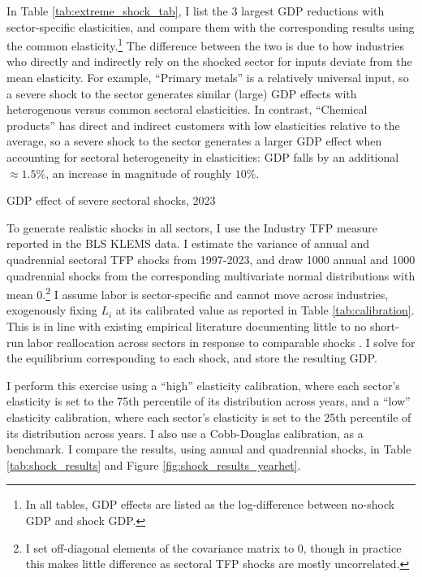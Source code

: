 \documentclass[11pt]{article}
\begin{document}
In Table \ref{tab:extreme_shock_tab}, I list the 3 largest GDP reductions with sector-specific elasticities, and compare them with the corresponding results using the common elasticity.\footnote{In all tables, GDP effects are listed as the log-difference between no-shock GDP and shock GDP.} The difference between the two is due to how industries who directly and indirectly rely on the shocked sector for inputs deviate from the mean elasticity. For example, ``Primary metals'' is a relatively universal input, so a severe shock to the sector generates similar (large) GDP effects with heterogenous versus common sectoral elasticities. In contrast, ``Chemical products'' has direct and indirect customers with low elasticities relative to the average, so a severe shock to the sector generates a larger GDP effect when accounting for sectoral heterogeneity in elasticities: GDP falls by an additional $\approx 1.5$\%, an increase in magnitude of roughly $10\%$.

\begin{table}
    \centering
    \caption{GDP effect of severe sectoral shocks, 2023}
    
    \label{tab:extreme_shock_tab}
\end{table}

To generate realistic shocks in all sectors, I use the Industry TFP measure reported in the BLS KLEMS data. I estimate the variance of annual and quadrennial sectoral TFP shocks from 1997-2023, and draw 1000 annual and 1000 quadrennial shocks from the corresponding multivariate normal distributions with mean 0.\footnote{I set off-diagonal elements of the covariance matrix to 0, though in practice this makes little difference as sectoral TFP shocks are mostly uncorrelated.} I assume labor is sector-specific and cannot move across industries, exogenously fixing $L_i$ at its calibrated value as reported in Table \ref{tab:calibration}. This is in line with existing empirical literature documenting little to no short-run labor reallocation across sectors in response to comparable shocks \citep{acemogluImportCompetitionGreat2016}.  I solve for the equilibrium corresponding to each shock, and store the resulting GDP.

I perform this exercise using a ``high'' elasticity calibration, where each sector's elasticity is set to the 75th percentile of its distribution across years, and a ``low'' elasticity calibration, where each sector's elasticity is set to the 25th percentile of its distribution across years. I also use a Cobb-Douglas calibration, as a benchmark. I compare the results, using annual and quadrennial shocks, in Table \ref{tab:shock_results} and Figure \ref{fig:shock_results_yearhet}. 
\end{document}
